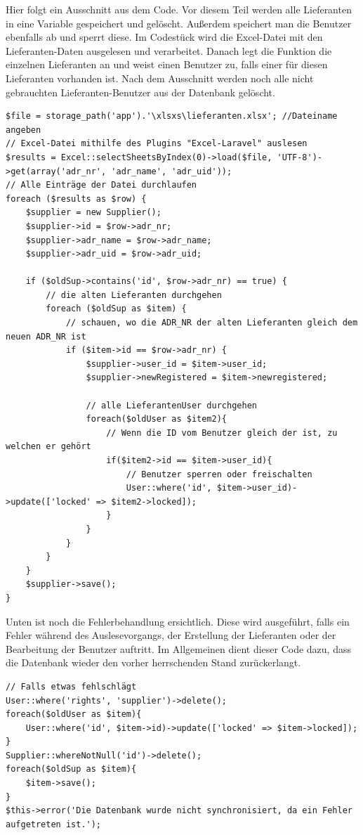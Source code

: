 \newpage
Hier folgt ein Ausschnitt aus dem Code. Vor diesem Teil werden alle Lieferanten in eine Variable gespeichert und gelöscht. Außerdem speichert man die Benutzer ebenfalls ab und sperrt diese. Im Codestück wird die Excel-Datei mit den Lieferanten-Daten ausgelesen und verarbeitet. Danach legt die Funktion die einzelnen Lieferanten an und weist einen Benutzer zu, falls einer für diesen Lieferanten vorhanden ist. Nach dem Ausschnitt werden noch alle nicht gebrauchten Lieferanten-Benutzer aus der Datenbank gelöscht.
\begin{lstlisting}
$file = storage_path('app').'\xlsxs\lieferanten.xlsx'; //Dateiname angeben
// Excel-Datei mithilfe des Plugins "Excel-Laravel" auslesen
$results = Excel::selectSheetsByIndex(0)->load($file, 'UTF-8')->get(array('adr_nr', 'adr_name', 'adr_uid'));
// Alle Einträge der Datei durchlaufen
foreach ($results as $row) {
    $supplier = new Supplier();
    $supplier->id = $row->adr_nr;
    $supplier->adr_name = $row->adr_name;
    $supplier->adr_uid = $row->adr_uid;

    if ($oldSup->contains('id', $row->adr_nr) == true) {
        // die alten Lieferanten durchgehen
        foreach ($oldSup as $item) {
            // schauen, wo die ADR_NR der alten Lieferanten gleich dem neuen ADR_NR ist
            if ($item->id == $row->adr_nr) {
                $supplier->user_id = $item->user_id;
                $supplier->newRegistered = $item->newregistered;

                // alle LieferantenUser durchgehen
                foreach($oldUser as $item2){
                    // Wenn die ID vom Benutzer gleich der ist, zu welchen er gehört
                    if($item2->id == $item->user_id){
                        // Benutzer sperren oder freischalten
                        User::where('id', $item->user_id)->update(['locked' => $item2->locked]);
                    }
                }
            }
        }
    }
    $supplier->save();
}
\end{lstlisting}
\newpage
Unten ist noch die Fehlerbehandlung ersichtlich. Diese wird ausgeführt, falls ein Fehler während des Auslesevorgangs, der Erstellung der Lieferanten oder der Bearbeitung der Benutzer auftritt. Im Allgemeinen dient dieser Code dazu, dass die Datenbank wieder den vorher herrschenden Stand zurückerlangt.
\begin{lstlisting}
// Falls etwas fehlschlägt
User::where('rights', 'supplier')->delete();
foreach($oldUser as $item){
    User::where('id', $item->id)->update(['locked' => $item->locked]);
}
Supplier::whereNotNull('id')->delete();
foreach($oldSup as $item){
    $item->save();
}
$this->error('Die Datenbank wurde nicht synchronisiert, da ein Fehler aufgetreten ist.');
\end{lstlisting}

